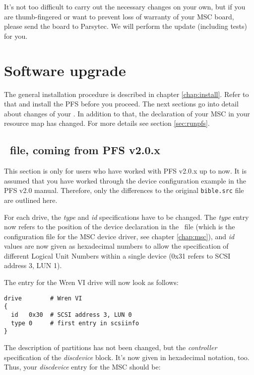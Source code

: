 It's not too difficult to carry out the necessary changes on your own, but if
you are thumb-fingered or want to prevent loss of warranty of your MSC board,
please send the board to Parsytec. We will perform the update (including
tests) for you.


\section{Software upgrade}

The general installation procedure is described in chapter
\ref{chap:install}. Refer to that and install the PFS before you proceed. The
next sections go into detail about changes of your \DIS. In addition to that,
the declaration of your MSC in your resource map has changed. For more
details see section \ref{sec:runpfs}.

\subsection{\DI\  file, coming from PFS v2.0.x}
This section is only for users who have worked with PFS v2.0.x up to now. It
is assumed that you have worked through the device configuration example in
the PFS v2.0 manual. Therefore, only the differences to the original
{\tt bible.src} file are outlined here.

For each drive, the {\it type} and {\it id} specifications have to be changed.
The {\it type} entry now refers to the position of the device declaration in
the \SIS\ file (which is the configuration file for the MSC device driver, see
chapter \ref{chap:msc}), and {\it id} values are now given as hexadecimal
numbers to allow the specification of different Logical Unit Numbers within a
single device (0x31 refers to SCSI address 3, LUN 1).

The entry for the Wren VI drive will now look as follows:

\begin{listing}
  \begin{verbatim}
drive        # Wren VI
{
  id   0x30  # SCSI address 3, LUN 0
  type 0     # first entry in scsiinfo
}
  \end{verbatim}
\end{listing}

The description of partitions has not been changed, but the {\it controller}
specification of the {\it discdevice} block. It's now given in hexadecimal
notation, too. Thus, your {\it discdevice} entry for the MSC should be:

